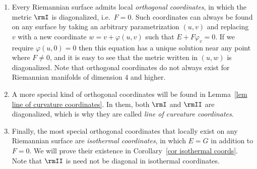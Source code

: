 \begin{rem}
    \begin{enumerate}
        \item Every Riemannian surface admits local \emph{orthogonal coordinates}, in which the metric $\rmI$ is diagonalized, i.e.\ $F=0$. 
        Such coordinates can always be found on any surface by taking an arbitrary parametrization $(u,v)$ and replacing $v$ with a new coordinate $w=v+\varphi(u,v)$ such that $E+F\varphi_v=0$. If we require $\varphi(u,0)=0$ then this equation has a unique solution near any point where $F\neq 0$, and it is easy to see that the metric written in $(u,w)$ is diagonalized. Note that orthogonal coordinates do not always exist for Riemannian manifolds of dimension $4$ and higher.
        \item A more special kind of orthogonal coordinates will be found in Lemma~\ref{lem line of curvature coordinates}. In them, both $\rmI$ and $\rmII$ are diagonalized, which is why they are called \emph{line of curvature coordinates}.
        \item Finally, the most special orthogonal coordinates that locally exist on any Riemannian surface are \emph{isothermal coordinates}, in which $E=G$ in addition to $F=0$. We will prove their existence in Corollary~\ref{cor isothermal coords}. Note that $\rmII$ is need not be diagonal in isothermal coordinates.
    \end{enumerate}
\end{rem}

